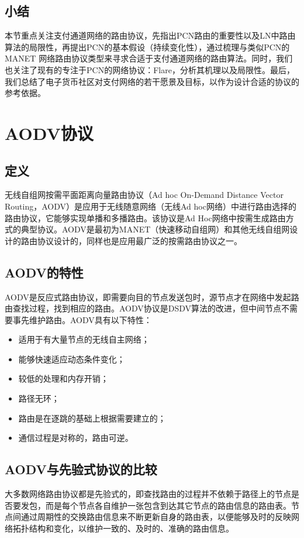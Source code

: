 \documentclass[12pt,a4paper]{article}
\begin{document}
\subsection{小结}
本节重点关注支付通道网络的路由协议，先指出PCN路由的重要性以及LN中路由算法的局限性，再提出PCN的基本假设（持续变化性），通过梳理与类似PCN的MANET 网络路由协议类型来寻求合适于支付通道网络的路由算法。同时，我们也关注了现有的专注于PCN的网络协议：Flare，分析其机理以及局限性。最后，我们总结了电子货币社区对支付网络的若干愿景及目标，以作为设计合适的协议的参考依据。

\section{AODV协议}

\subsection{定义}
无线自组网按需平面距离向量路由协议（Ad hoc On-Demand Distance Vector Routing，AODV）是应用于无线随意网络（无线Ad hoc网络）中进行路由选择的路由协议，它能够实现单播和多播路由\cite{Perkins2003}。该协议是Ad Hoc网络中按需生成路由方式的典型协议。AODV是最初为MANET\cite{cs441_manet}（快速移动自组网）和其他无线自组网设计的路由协议设计的，同样也是应用最广泛的按需路由协议之一。

\subsection{AODV的特性}
AODV是反应式路由协议，即需要向目的节点发送包时，源节点才在网络中发起路由查找过程，找到相应的路由。AODV协议是DSDV算法的改进，但中间节点不需要事先维护路由。AODV具有以下特性：
\begin{itemize}
	\item 适用于有大量节点的无线自主网络；
	\item 能够快速适应动态条件变化；
	\item 较低的处理和内存开销；
	\item 路径无环；
	\item 路由是在逐跳的基础上根据需要建立的；
	\item 通信过程是对称的，路由可逆。
\end{itemize}

\subsection{AODV与先验式协议的比较}
大多数网络路由协议都是先验式的，即查找路由的过程并不依赖于路径上的节点是否要发包，而是每个节点各自维护一张包含到达其它节点的路由信息的路由表。节点间通过周期性的交换路由信息来不断更新自身的路由表，以便能够及时的反映网络拓扑结构和变化，以维护一致的、及时的、准确的路由信息。
\end{document}
